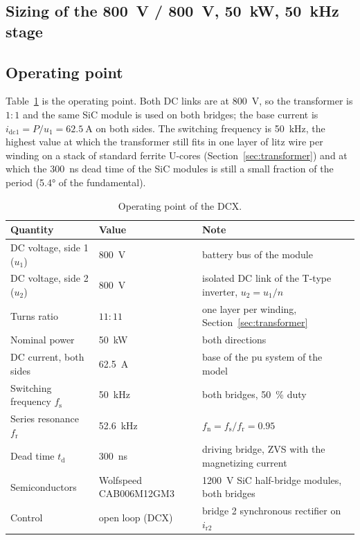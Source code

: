 \documentclass[12pt,a4paper]{scrartcl}
\newcommand{\ped}[1]{_{\mathrm{#1}}}
\begin{document}
\begin{onehalfspace}
\section{Sizing of the \SI{800}{\volt} / \SI{800}{\volt}, \SI{50}{\kilo\watt}, \SI{50}{\kilo\hertz} stage}
\label{sec:sizing}

\subsection{Operating point}
\label{sec:op}

Table~\ref{tab:op} is the operating point. Both DC links are at \SI{800}{\volt}, so the transformer is $1:1$ and the same SiC module is used on both bridges; the base current is $i\ped{dc1} = P/u\ped{1} = \SI{62.5}{\ampere}$ on both sides. The switching frequency is \SI{50}{\kilo\hertz}, the highest value at which the transformer still fits in one layer of litz wire per winding on a stack of standard ferrite U-cores (Section~\ref{sec:transformer}) and at which the \SI{300}{\nano\second} dead time of the SiC modules is still a small fraction of the period (\ang{5.4} of the fundamental).

\begin{table}[H]
	\centering
	\captionsetup{width=0.9\textwidth, font=small}
	\caption{Operating point of the DCX.}
	\label{tab:op}
	\begin{tabularx}{0.95\textwidth}{@{} l l X @{}}
		\toprule
		\textbf{Quantity} & \textbf{Value} & \textbf{Note} \\
		\midrule
		DC voltage, side 1 ($u\ped{1}$) & \SI{800}{\volt} & battery bus of the module \\
		DC voltage, side 2 ($u\ped{2}$) & \SI{800}{\volt} & isolated DC link of the T-type inverter, $u\ped{2} = u\ped{1}/n$ \\
		Turns ratio & $11:11$ & one layer per winding, Section~\ref{sec:transformer} \\
		Nominal power & \SI{50}{\kilo\watt} & both directions \\
		DC current, both sides & \SI{62.5}{\ampere} & base of the pu system of the model \\
		Switching frequency $f\ped{s}$ & \SI{50}{\kilo\hertz} & both bridges, \SI{50}{\percent} duty \\
		Series resonance $f\ped{r}$ & \SI{52.6}{\kilo\hertz} & $f\ped{n} = f\ped{s}/f\ped{r} = 0.95$ \\
		Dead time $t\ped{d}$ & \SI{300}{\nano\second} & driving bridge, ZVS with the magnetizing current \\
		Semiconductors & Wolfspeed CAB006M12GM3 & \SI{1200}{\volt} SiC half-bridge modules, both bridges \\
		Control & open loop (DCX) & bridge 2 synchronous rectifier on $i\ped{r2}$ \\
		\bottomrule
	\end{tabularx}
\end{table}


\end{onehalfspace}
\end{document}
